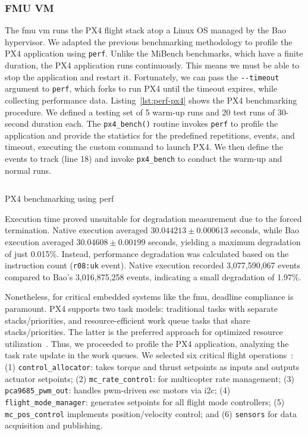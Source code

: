 \subsubsection{FMU VM}
\label{sec:fmu-vm}
The \gls{fmu} \gls{vm} runs the PX4 flight stack atop a Linux OS managed by the
Bao hypervisor. We adapted the previous benchmarking methodology to profile the
PX4 application using \lstinline{perf}. Unlike the MiBench benchmarks, which
have a finite duration, the PX4 application runs continuously. This means we
must be able to stop the application and restart it. Fortunately, we can pass the \lstinline{--timeout} argument to \lstinline{perf}, which
forks to run PX4 until the timeout expires, while collecting performance data.
%
Listing~\ref{lst:perf-px4} shows the PX4 benchmarking procedure. We defined a
testing set of 5 warm-up runs and 20 test runs of 30-second duration each.
The \lstinline{px4_bench()} routine invokes \lstinline{perf} to profile the
application and provide the statistics for the predefined repetitions, events,
and timeout, executing the custom command to launch PX4.
We then define the events to track (line 18) and invoke \lstinline{px4_bench} to
conduct the warm-up and normal runs.

\begin{longlisting}
\centering
\inputminted[]{bash}{./listing/perfPX4.sh}
\caption{PX4 benchmarking using perf}
\label{lst:perf-px4}
\end{longlisting}

Execution time proved unsuitable for degradation measurement due to the forced
termination. Native execution averaged $30.044213 \pm 0.000613$ seconds, while
Bao execution averaged $30.04608 \pm 0.00199$ seconds, yielding a maximum
degradation of just 0.015\%. Instead, performance degradation was calculated
based on the instruction count (\lstinline{r08:uk} event). Native execution
recorded 3,077,590,067 events compared to Bao's 3,016,875,258 events, indicating
a small degradation of 1.97\%.

Nonetheless, for critical embedded systems like the \gls{fmu}, deadline compliance is
paramount. PX4 supports two task models: traditional tasks with separate
stacks/priorities, and resource-efficient work queue tasks that share
stacks/priorities. The latter is the preferred approach for optimized resource
utilization~\cite{px4WorkQueue}. Thus, we proceeded to profile the PX4
application, analyzing the task rate update in the work queues. We selected six critical flight operations~\cite{px4ModulesRefCtrl,px4ModulesRefDriver,px4ModulesRefSystem}:
(1) \lstinline{control_allocator}: takes torque and thrust setpoints as inputs
and outputs actuator setpoints;
(2) \lstinline{mc_rate_control}: for multicopter rate management; 
(3) \lstinline{pca9685_pwm_out}: handles \gls{pwm}-driven \gls{esc} motors via \gls{i2c};
(4) \lstinline{flight_mode_manager}: generates setpoints for all flight mode controllers; 
(5) \lstinline{mc_pos_control} implements position/velocity control; and 
(6) \lstinline{sensors} for data acquisition and publishing.

